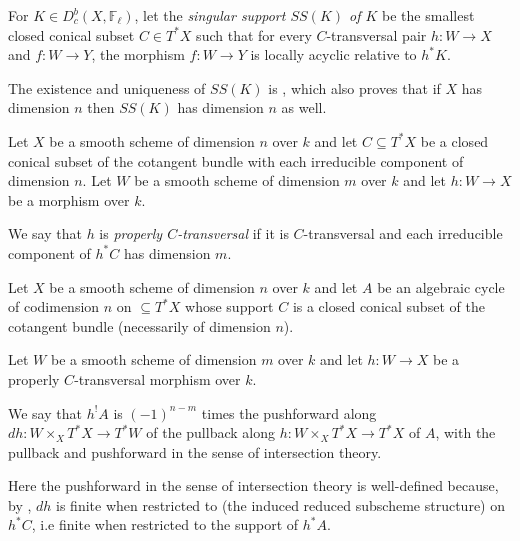 \begin{definition}
\notready\cite[1.3]{Beilinson} For $K \in D^b_c(X, \mathbb F_\ell)$, let the \emph{singular support $SS(K)$ of $K$} be the smallest closed conical subset $C \in T^* X$ such that for every $C$-transversal pair $h: W \to X$ and $f: W\to Y$, the morphism $f: W\to Y$ is locally acyclic relative to $h^* K$.

\end{definition}
The existence and uniqueness of $SS(K)$ is \cite[Theorem 1.3]{Beilinson}, which also proves that if $X$ has dimension $n$ then $SS(K)$ has dimension $n$ as well.


\begin{definition}
\notready\cite[Definition 7.1(1)]{saito1} Let $X$ be a smooth scheme of dimension $n$ over $k$ and let $C \subseteq T^* X$ be a closed conical subset of the cotangent bundle with each irreducible component of dimension $n$. Let $W$ be a smooth scheme of dimension $m$ over $k$ and let $h: W \to X$ be a morphism over $k$.

We say that $h$ is \emph{properly $C$-transversal} if it is $C$-transversal and each irreducible component of $h^* C$ has dimension $m$. \end{definition}

\begin{definition}
\notready\cite[Definition 7.1(2)]{saito1} Let $X$ be a smooth scheme of dimension $n$ over $k$ and let $A$ be an algebraic cycle of codimension $n$ on $\subseteq T^* X$ whose support $C$ is a closed conical subset of the cotangent bundle (necessarily of dimension $n$).

 Let $W$ be a smooth scheme of dimension $m$ over $k$ and let $h: W \to X$ be a properly $C$-transversal morphism over $k$.

 We say that $h^{!} A$ is $(-1)^{n-m}$ times the pushforward along $dh:  W \times_X T^* X \to T^* W$ of the pullback along $h:  W \times_X T^* X \to T^* X$ of $A$, with the pullback and pushforward in the sense of intersection theory.  \end{definition}

Here the pushforward in the sense of intersection theory is well-defined because, by \cite[Lemma 3.1]{saito1}, $dh$ is finite when restricted to (the induced reduced subscheme structure) on $h^* C$, i.e finite when restricted to the support of $h^* A$.


